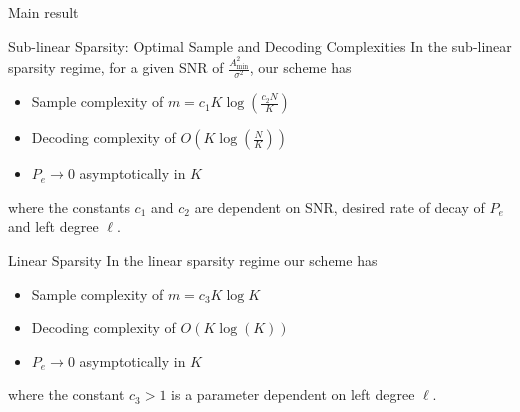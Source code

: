 \begin{frame}{Main result}
\begin{block}{Sub-linear Sparsity: Optimal Sample and Decoding Complexities}
In the sub-linear sparsity regime, for a given SNR of $\frac{A^{2}_{\text{min}}}{\sigma^{2}}$, our scheme has 
\begin{itemize}
\item Sample complexity of $m=c_1 K\log (\frac{c_2 N}{K})$
\item Decoding complexity of $O\left(K\log(\frac{N}{K})\right)$ 
\item $P_e\rightarrow 0$ asymptotically in $K$
\end{itemize} 
where the constants $c_{1}$ and $c_{2}$ are dependent on SNR, desired rate of decay of $P_e$ and left degree $\ell$.
\end{block}
\begin{block}{Linear Sparsity}
In the linear sparsity regime our scheme has 
\begin{itemize}
\item Sample complexity of $m=c_3 K\log K$
\item Decoding complexity of $O\left(K\log(K)\right)$ 
\item $P_e\rightarrow 0$ asymptotically in $K$
\end{itemize} 
where the constant $c_{3}>1$ is a parameter dependent on left degree $\ell$.
\end{block}
\end{frame}

